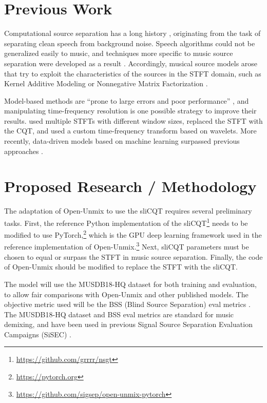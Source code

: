 \documentclass[letter,12pt]{article}
\begin{document}
\section{Previous Work}

Computational source separation has a long history \parencite{musicsepgood}, originating from the task of separating clean speech from background noise. Speech algorithms could not be generalized easily to music, and techniques more specific to music source separation were developed as a result \parencite{musicseptechniques1}. Accordingly, musical source models arose that try to exploit the characteristics of the sources in the STFT domain, such as Kernel Additive Modeling or Nonnegative Matrix Factorization \parencite{musicsepgood}.

Model-based methods are ``prone to large errors and poor performance'' \parencite[13]{musicsepintro1}, and manipulating time-frequency resolution is one possible strategy to improve their results. \textcite{driedger} used multiple STFTs with different window sizes, \textcite{fitzgerald2} replaced the STFT with the CQT, and \textcite{wavelets} used a custom time-frequency transform based on wavelets. More recently, data-driven models based on machine learning surpassed previous approaches \parencite{sisec2018, musicsepintro1}.

\section{Proposed Research / Methodology}

The adaptation of Open-Unmix to use the sliCQT requires several preliminary tasks. First, the reference Python implementation of the sliCQT\footnote{\url{https://github.com/grrrr/nsgt}} needs to be modified to use PyTorch,\footnote{\url{https://pytorch.org}} which is the GPU deep learning framework used in the reference implementation of Open-Unmix.\footnote{\url{https://github.com/sigsep/open-unmix-pytorch}} Next, sliCQT parameters must be chosen to equal or surpass the STFT in music source separation. Finally, the code of Open-Unmix should be modified to replace the STFT with the sliCQT.

The model will use the MUSDB18-HQ dataset \parencite{musdb18hq} for both training and evaluation, to allow fair comparisons with Open-Unmix and other published models. The objective metric used will be the BSS (Blind Source Separation) eval metrics \parencite{bss}. The MUSDB18-HQ dataset and BSS eval metrics are standard for music demixing, and have been used in previous Signal Source Separation Evaluation Campaigns (SiSEC) \parencite{sisec2018}.
\end{document}
